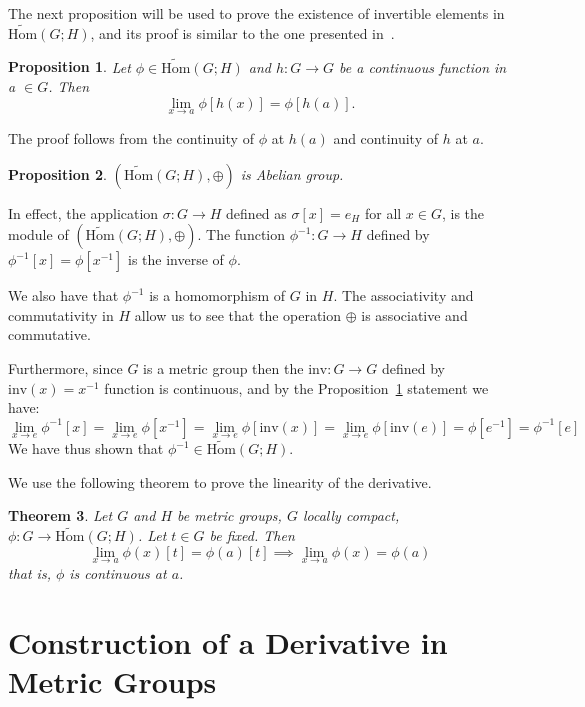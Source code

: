\documentclass{article}
\newtheorem{theorem}{Theorem}[section]
\newtheorem{proposition}[theorem]{Proposition}
\numberwithin{theorem}{section}
\numberwithin{equation}{section}
\begin{document}
The next proposition will be used to prove the existence of invertible elements in $\tilde{\mathrm{Hom}}(G; H)$, and its proof is similar to the one presented in~\cite{arora2021}.

\begin{proposition}\label{prop2}
Let $\phi \in \tilde{\mathrm{Hom}}(G; H)$ and $h : G \to G$ be a continuous function in a $\in G$. Then
\[
\lim_{x\to a} \phi[h(x)] = \phi[h(a)].
\]
\end{proposition}

The proof follows from the continuity of $\phi$ at $h(a)$ and continuity of $h$ at $a$.

\begin{proposition}\label{prop3}
$(\tilde{\mathrm{Hom}}(G; H), \oplus)$ is Abelian group.
\end{proposition}

In effect, the application $\sigma : G \to H$ defined as $\sigma[x] = e_H$ for all $x \in G$, is the module of $(\tilde{\mathrm{Hom}}(G; H), \oplus)$. The function $\phi^{-1} : G \to H$ defined by $\phi^{-1}[x] = \phi[x^{-1}]$ is the inverse of $\phi$. 

We also have that $\phi^{-1}$ is a homomorphism of $G$ in $H$. The associativity and commutativity in $H$ allow us to see that the operation $\oplus$ is associative and commutative.

Furthermore, since $G$ is a metric group then the $\mathrm{inv} : G \to G$ defined by $\mathrm{inv}(x) = x^{-1}$ function is continuous, and by the Proposition~\ref{prop2} statement we have:
\[
\lim_{x\to e} \phi^{-1}[x] = \lim_{x\to e} \phi[x^{-1}] = \lim_{x\to e} \phi[\mathrm{inv}(x)] = \lim_{x\to e} \phi[\mathrm{inv}(e)] = \phi[e^{-1}] = \phi^{-1}[e]
\]
We have thus shown that $\phi^{-1} \in \tilde{\mathrm{Hom}}(G; H)$.

We use the following theorem to prove the linearity of the derivative.

\begin{theorem}\label{thm1}
Let $G$ and $H$ be metric groups, $G$ locally compact, $\phi : G \to \tilde{\mathrm{Hom}}(G; H)$. Let $t \in G$ be fixed. Then
\[
\lim_{x\to a} \phi(x)[t] = \phi(a)[t] \implies \lim_{x\to a} \phi(x) = \phi(a)
\]
that is, $\phi$ is continuous at $a$.
\end{theorem}

\section{Construction of a Derivative in Metric Groups}
\end{document}
